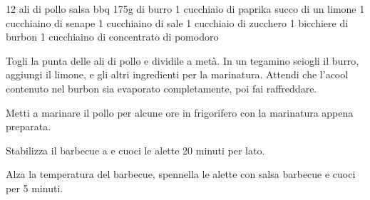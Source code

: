 \begin{ingreds}
	12 ali di pollo
	salsa bbq
\columnbreak
{}
	175g di burro
	1 cucchiaio di paprika
	succo di un limone
	1 cucchiaino di senape
	1 cucchiaino di sale
	1 cucchiaio di zucchero
	1 bicchiere di burbon
	1 cucchiaino di concentrato di pomodoro
\end{ingreds}

\begin{method}
Togli la punta delle ali di pollo e dividile a metà. In un tegamino sciogli il burro, aggiungi il limone, e gli altri ingredienti per la marinatura. Attendi che l'acool contenuto nel burbon sia evaporato completamente, poi fai raffreddare.

Metti a marinare il pollo per alcune ore in frigorifero con la marinatura appena preparata.

Stabilizza il barbecue a  e cuoci le alette 20 minuti per lato.

Alza la temperatura del barbecue, spennella le alette con salsa barbecue e cuoci per 5 minuti.
\end {method}
